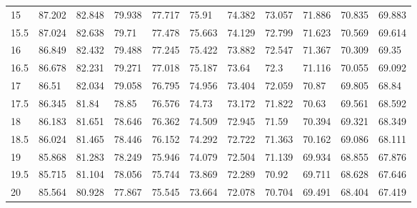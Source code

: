 \begin{bibunit}
\begin{table}[]
\begin{tabular}{lllllllllll}
		15   & 87.202 & 82.848 & 79.938 & 77.717 & 75.91  & 74.382 & 73.057 & 71.886 & 70.835 & 69.883 \\
		15.5 & 87.024 & 82.638 & 79.71  & 77.478 & 75.663 & 74.129 & 72.799 & 71.623 & 70.569 & 69.614 \\
		16   & 86.849 & 82.432 & 79.488 & 77.245 & 75.422 & 73.882 & 72.547 & 71.367 & 70.309 & 69.35  \\
		16.5 & 86.678 & 82.231 & 79.271 & 77.018 & 75.187 & 73.64  & 72.3   & 71.116 & 70.055 & 69.092 \\
		17   & 86.51  & 82.034 & 79.058 & 76.795 & 74.956 & 73.404 & 72.059 & 70.87  & 69.805 & 68.84  \\
		17.5 & 86.345 & 81.84  & 78.85  & 76.576 & 74.73  & 73.172 & 71.822 & 70.63  & 69.561 & 68.592 \\
		18   & 86.183 & 81.651 & 78.646 & 76.362 & 74.509 & 72.945 & 71.59  & 70.394 & 69.321 & 68.349 \\
		18.5 & 86.024 & 81.465 & 78.446 & 76.152 & 74.292 & 72.722 & 71.363 & 70.162 & 69.086 & 68.111 \\
		19   & 85.868 & 81.283 & 78.249 & 75.946 & 74.079 & 72.504 & 71.139 & 69.934 & 68.855 & 67.876 \\
		19.5 & 85.715 & 81.104 & 78.056 & 75.744 & 73.869 & 72.289 & 70.92  & 69.711 & 68.628 & 67.646 \\
		20   & 85.564 & 80.928 & 77.867 & 75.545 & 73.664 & 72.078 & 70.704 & 69.491 & 68.404 & 67.419 \\
	\end{tabular}
\end{table}


\end{bibunit}